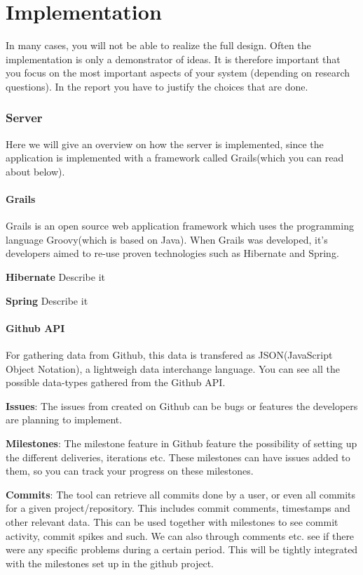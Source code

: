 \chapter{Implementation}
In many cases, you will not be able to realize the full design. Often the implementation is only a demonstrator of ideas. 
It is therefore important that you focus on the most important aspects of your system (depending on research questions). 
In the report you have to justify the choices that are done.

\subsection{Server}
Here we will give an overview on how the server is implemented, since the application is implemented with a framework called Grails(which you can read about below).

\subsubsection{Grails}
Grails is an open source web application framework which uses the programming language Groovy(which is based on Java). When Grails was developed, it's developers aimed to re-use proven technologies such as Hibernate and Spring.

\textbf{Hibernate}
Describe it

\textbf{Spring}
Describe it

\subsubsection{Github API}
For gathering data from Github, this data is transfered as JSON(JavaScript Object Notation), a lightweigh data interchange language. You can see all the possible data-types gathered from the Github API.

\textbf{Issues}:
The issues from created on Github can be bugs or features the developers are planning to implement.

\textbf{Milestones}:
The milestone feature in Github feature the possibility of setting up the different deliveries, iterations etc. These milestones can have issues added to them, so you can track your progress on these milestones.

\textbf{Commits}:
The tool can retrieve all commits done by a user, or even all commits for a given project/repository. This includes commit comments, timestamps and other relevant data. This can be used together with milestones to see commit activity, commit spikes and such. We can also through comments etc. see if there were any specific problems during a certain period. This will be tightly integrated with the milestones set up in the github project. 


